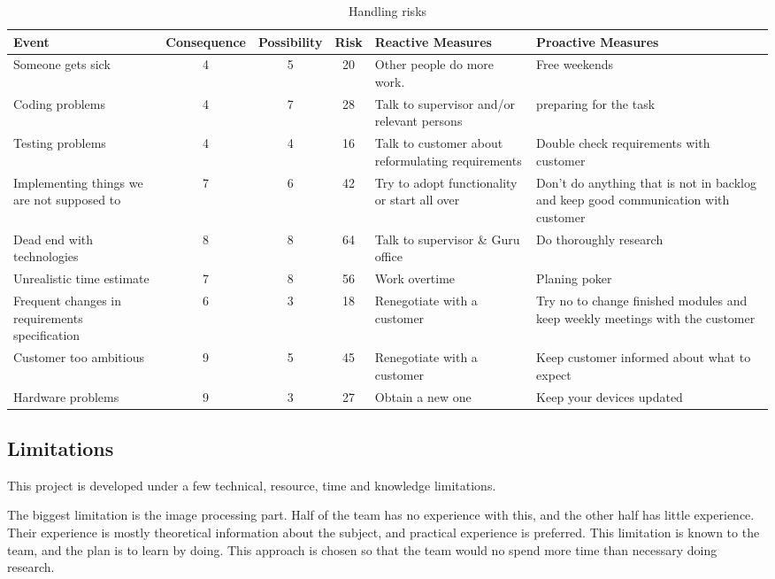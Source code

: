 \begin{table}
    \caption{Handling risks}
    \label{tab:risks}
    
    \centering {}
    \vspace{2mm} %
    \begin{tabularx}{500pt}{XcccXX}
    \toprule
        Event & Consequence & Possibility & Risk  & Reactive Measures & Proactive Measures \\
    \midrule
Someone gets sick & 4     & 5     & 20    & Other people do more work.  & Free weekends \\
Coding problems & 4     & 7     & 28    & Talk to supervisor and/or relevant persons & preparing for the task \\
Testing problems & 4     & 4     & 16    & Talk to customer about reformulating requirements & Double check requirements with customer \\
Implementing things we are not supposed to & 7     & 6     & 42    & Try to adopt functionality or start all over & Don't do anything that is not in backlog and keep good communication with customer \\
Dead end with technologies & 8     & 8     & 64    & Talk to supervisor \& Guru office & Do thoroughly research \\
Unrealistic time estimate & 7     & 8     & 56    & Work overtime  & Planing poker \\
Frequent changes in requirements specification & 6     & 3     & 18    & Renegotiate with a customer & Try no to change finished modules and keep weekly meetings with the customer \\
Customer too ambitious & 9     & 5     & 45    & Renegotiate with a customer & Keep customer informed about what  to expect \\
Hardware problems & 9     & 3     & 27    & Obtain a new one & Keep your devices updated \\
\bottomrule
\end{tabularx}
\end{table}
\subsection{Limitations}
\label{sec:limitations}
This project is developed under a few technical, resource, time and knowledge limitations. 

The biggest limitation is the image processing part. Half of the team has no experience with this, and the other half has little experience. Their experience is mostly theoretical information about the subject, and practical experience is preferred. This limitation is known to the team, and the plan is to learn by doing. This approach is chosen so that the team would no spend more time than necessary doing research.

